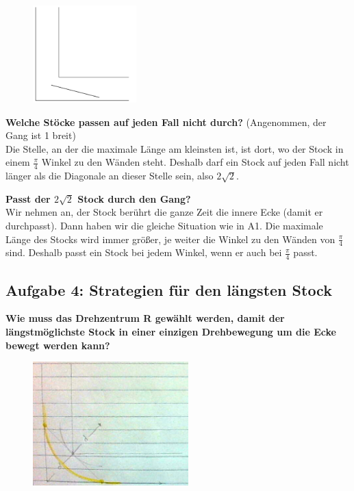 \documentclass[a4paper,11pt]{article}
\begin{document}
\begin{figure}[H] 
        \centering
        \includegraphics[width=4cm]{img/A3_1.png}
\end{figure}

\textbf{Welche St\"ocke passen auf jeden Fall nicht durch?} (Angenommen, der Gang ist 1 breit) \\
Die Stelle, an der die maximale Länge am kleinsten ist, ist dort, wo der Stock in einem $\frac{\pi}{4}$ Winkel zu den Wänden steht. Deshalb darf ein Stock auf jeden Fall nicht länger als die Diagonale an dieser Stelle sein, also $2\sqrt{2}$.

\textbf{Passt der $2\sqrt{2}$ Stock durch den Gang?} \\
Wir nehmen an, der Stock berührt die ganze Zeit die innere Ecke (damit er durchpasst). Dann haben wir die gleiche Situation wie in A1. Die maximale Länge des Stocks wird immer größer, je weiter die Winkel zu den Wänden von $\frac{\pi}{4}$ sind. Deshalb passt ein Stock bei jedem Winkel, wenn er auch bei $\frac{\pi}{4}$ passt.

\subsection{Aufgabe 4: Strategien f\"ur den l\"angsten Stock}
\textbf{Wie muss das Drehzentrum R gew\"ahlt werden, damit der l\"angstm\"oglichste Stock in einer einzigen Drehbewegung um die Ecke bewegt werden kann?} \\

\begin{figure}[htbp] 
        \centering
        \includegraphics[width=6cm]{img/A4_1.png}
\end{figure}
\end{document}
